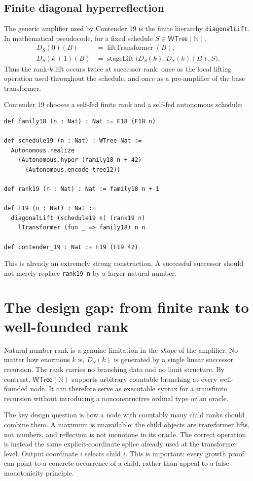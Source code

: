 \documentclass[11pt]{article}
\theoremstyle{definition}
\newcommand{\Nat}{\mathbb{N}}
\newcommand{\WTree}{\mathsf{WTree}(\Nat)}
\newcommand{\code}[1]{\texttt{#1}}
\begin{document}
\subsection{Finite diagonal hyperreflection}

The generic amplifier used by Contender 19 is the finite hierarchy
\code{diagonalLift}.  In mathematical pseudocode, for a fixed schedule
\(S\in\WTree\),
\begin{align*}
  D_S(0)(B) &= \operatorname{liftTransformer}(B),\\
  D_S(k+1)(B) &=
    \operatorname{stageLift}\bigl(D_S(k),D_S(k)(B),S\bigr).
\end{align*}
Thus the rank-\(k\) lift occurs twice at successor rank: once as the local
lifting operation used throughout the schedule, and once as a pre-amplifier
of the base transformer.

Contender 19 chooses a self-fed finite rank and a self-fed autonomous schedule:
\begin{lstlisting}
def family18 (n : Nat) : Nat := F18 (F18 n)

def schedule19 (n : Nat) : WTree Nat :=
  Autonomous.realize
    (Autonomous.hyper (family18 n + 42)
      (Autonomous.encode tree12))

def rank19 (n : Nat) : Nat := family18 n + 1

def F19 (n : Nat) : Nat :=
  diagonalLift (schedule19 n) (rank19 n)
    lTransformer (fun _ => family18) n n

def contender_19 : Nat := F19 (F19 42)
\end{lstlisting}
This is already an extremely strong construction.  A successful successor
should not merely replace \code{rank19 n} by a larger natural number.

\section{The design gap: from finite rank to well-founded rank}

Natural-number rank is a genuine limitation in the \emph{shape} of the
amplifier.  No matter how enormous \(k\) is, \(D_S(k)\) is generated by a
single linear successor recursion.  The rank carries no branching data and no
limit structure.  By contrast, \(\WTree\) supports arbitrary countable
branching at every well-founded node.  It can therefore serve as executable
syntax for a transfinite recursion without introducing a nonconstructive
ordinal type or an oracle.

The key design question is how a node with countably many child ranks should
combine them.  A maximum is unavailable: the child objects are transformer
lifts, not numbers, and reflection is not monotone in its oracle.  The correct
operation is instead the same explicit-coordinate splice already used at the
transformer level.  Output coordinate \(i\) selects child \(i\).  This is
important: every growth proof can point to a concrete occurrence of a child,
rather than appeal to a false monotonicity principle.
\end{document}
